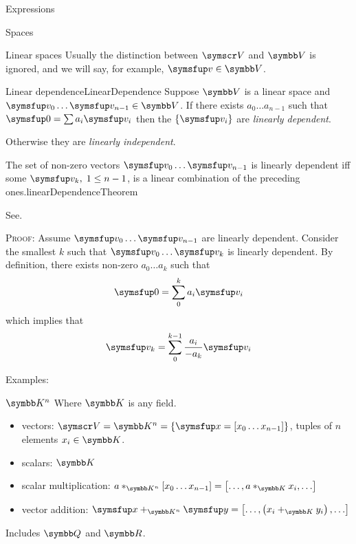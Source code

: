 \documentclass{PalisadesLakesArticle}
\begin{document}
\begin{plSection}{Expressions}
\begin{plSection}{Spaces}
\begin{plSection}{Linear spaces}
Usually the distinction between $\Set{V}$ and $\Space{V}$ 
is ignored, and we will say, for example, 
$\Vector{v} \in \Space{V}$.

\begin{plDefinition}{Linear dependence}{LinearDependence}
Suppose $\Space{V}$ is a linear space and
$\Vector{v}_0 \ldots  \Vector{v}_{n-1} \in \Space{V}$.
If there exists $a_0 \ldots  a_{n-1}$ such that
$\Vector{0} = \sum a_i \Vector{v}_i$ then the $\left\{ \Vector{v}_i \right\}$
are \textit{linearly dependent}.

Otherwise they are \textit{linearly independent}.
\end{plDefinition}

\begin{plTheorem}{The set of non-zero vectors
 $\Vector{v}_0 \ldots \Vector{v}_{n-1}$
is linearly dependent iff some $\Vector{v}_k, \; 1 \leq n-1$, 
is a linear combination of the preceding 
ones.}{linearDependenceTheorem}

See.

\textsc{Proof:}
Assume  $\Vector{v}_0 \ldots \Vector{v}_{n-1}$ are linearly dependent.
Consider the smallest $k$ such that 
$\Vector{v}_0 \ldots \Vector{v}_{k}$ is linearly dependent.
By definition,
there exists non-zero $a_0 \ldots a_{k}$ such that
\begin{equation}
\Vector{0} = \sum_0^k a_i \Vector{v}_i
\end{equation}
which implies that
\begin{equation}
\Vector{v}_k = \sum_0^{k-1} \frac{a_i}{- a_k} \Vector{v}_i
\end{equation}
\end{plTheorem}

Examples:

\begin{plExample}{$\Space{K}^n$}{}
Where $\Space{K}$ is any field.
\begin{itemize}
  \item vectors:
  $\Set{V} = \Space{K}^n = \left\{ \Vector{x}
  = \left[ x_0 \ldots  x_{n-1} \right] \right\}$,
  tuples of $n$ elements $x_i \in \Space{K}$.
  \item scalars: $\Space{K}$
  \item scalar multiplication:
  $ a *_{\Space{K}^n} \left[ x_0 \ldots  x_{n-1} \right] =
  \left[ \ldots , a *_{\Space{K}} x_{i} , \ldots \right]$
  \item vector addition:
  $\Vector{x} +_{\Space{K}^n} \Vector{y}
  = \left[ \ldots , \left( x_i +_{\Space{K}} y_i \right) ,\ldots \right]$
\end{itemize}
Includes $\Space{Q}$ and $\Space{R}$.
\end{plExample}


\end{plSection}
\end{plSection}
\end{plSection}
\end{document}
